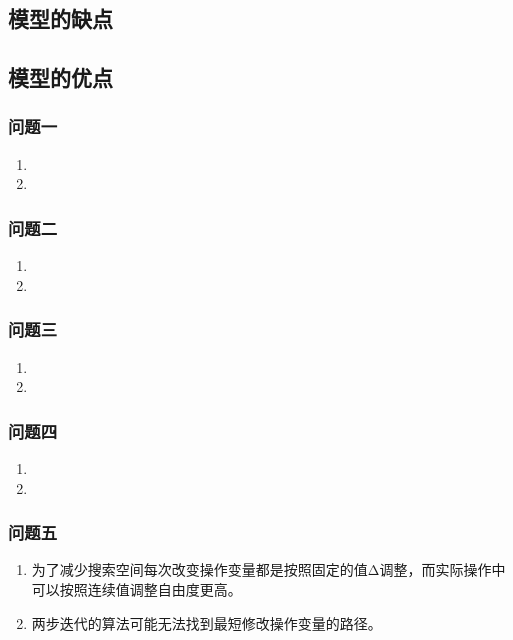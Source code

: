 \documentclass[bwprint]{gmcmthesis}
\begin{document}
\FloatBarrier
\subsection{模型的缺点}

\FloatBarrier
\subsection{模型的优点}
\FloatBarrier
\subsubsection{问题一}
\begin{enumerate}[itemindent=20pt]
    \item 
    \item 
\end{enumerate}

\FloatBarrier
\subsubsection{问题二}
\begin{enumerate}[itemindent=20pt]
    \item 
    \item 
\end{enumerate}


\FloatBarrier
\subsubsection{问题三}
\begin{enumerate}[itemindent=20pt]
    \item 
    \item 
\end{enumerate}


\FloatBarrier
\subsubsection{问题四}
\begin{enumerate}[itemindent=20pt]
    \item 
    \item 
\end{enumerate}

\FloatBarrier
\subsubsection{问题五}

\begin{enumerate}[itemindent=20pt]
    \item 为了减少搜索空间每次改变操作变量都是按照固定的值Δ调整，而实际操作中可以按照连续值调整自由度更高。
    \item 两步迭代的算法可能无法找到最短修改操作变量的路径。
\end{enumerate}
\end{document}
